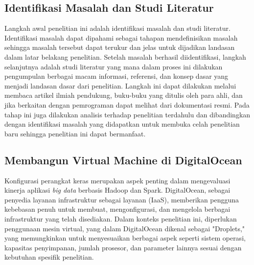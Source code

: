 \subsection{Identifikasi Masalah dan Studi Literatur}
Langkah awal penelitian ini adalah identifikasi masalah dan studi literatur. Identifikasi masalah dapat dipahami sebagai tahapan mendefinisikan masalah sehingga masalah tersebut dapat terukur dan jelas untuk dijadikan landasan dalam latar belakang penelitian. Setelah masalah berhasil diidentifikasi, langkah selanjutnya adalah studi literatur yang mana dalam proses ini dilakukan pengumpulan berbagai macam informasi, referensi, dan konsep dasar yang menjadi landasan dasar dari penelitian. Langkah ini dapat dilakukan melalui membaca artikel ilmiah pendukung, buku-buku yang ditulis oleh para ahli, dan jika berkaitan dengan pemrograman dapat melihat dari dokumentasi resmi. Pada tahap ini juga dilakukan analisis terhadap penelitian terdahulu dan dibandingkan dengan identifikasi masalah yang didapatkan untuk membuka celah penelitian baru sehingga penelitian ini dapat bermanfaat. 

\subsection{Membangun Virtual Machine di DigitalOcean}
Konfigurasi perangkat keras merupakan aspek penting dalam mengevaluasi kinerja aplikasi \textit{big data} berbasis Hadoop dan Spark. DigitalOcean, sebagai penyedia layanan infrastruktur sebagai layanan (IaaS), memberikan pengguna kebebasan penuh untuk membuat, mengonfigurasi, dan mengelola berbagai infrastruktur yang telah disediakan. Dalam konteks penelitian ini, diperlukan penggunaan mesin virtual, yang dalam DigitalOcean dikenal sebagai "Droplets," yang memungkinkan untuk menyesuaikan berbagai aspek seperti sistem operasi, kapasitas penyimpanan, jumlah prosesor, dan parameter lainnya sesuai dengan kebutuhan spesifik penelitian.

